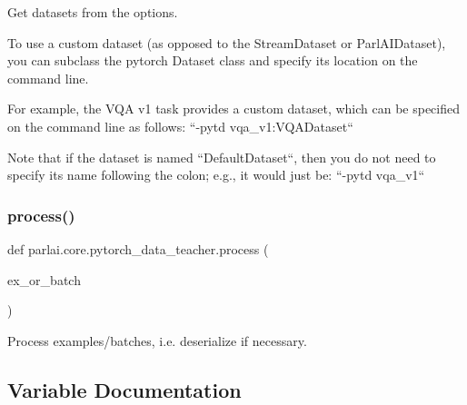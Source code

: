 \begin{DoxyVerb}Get datasets from the options.

To use a custom dataset (as opposed to the StreamDataset or ParlAIDataset),
you can subclass the pytorch Dataset class and specify its location on the
command line.

For example, the VQA v1 task provides a custom dataset, which can
be specified on the command line as follows: ``-pytd vqa_v1:VQADataset``

Note that if the dataset is named ``DefaultDataset``, then you do
not need to specify its name following the colon; e.g., it
would just be: ``-pytd vqa_v1``
\end{DoxyVerb}
 \mbox{\label{namespaceparlai_1_1core_1_1pytorch__data__teacher_a7b71207eb86027bc93809c1e4d57f641}} 
\subsubsection{\texorpdfstring{process()}{process()}}
{\footnotesize\ttfamily def parlai.\+core.\+pytorch\+\_\+data\+\_\+teacher.\+process (\begin{DoxyParamCaption}\item[{}]{ex\+\_\+or\+\_\+batch }\end{DoxyParamCaption})}

\begin{DoxyVerb}Process examples/batches, i.e. deserialize if necessary.
\end{DoxyVerb}
 

\subsection{Variable Documentation}
\mbox{\label{namespaceparlai_1_1core_1_1pytorch__data__teacher_a34008e5ea53ba69d5da10b59d55abef4}} 
